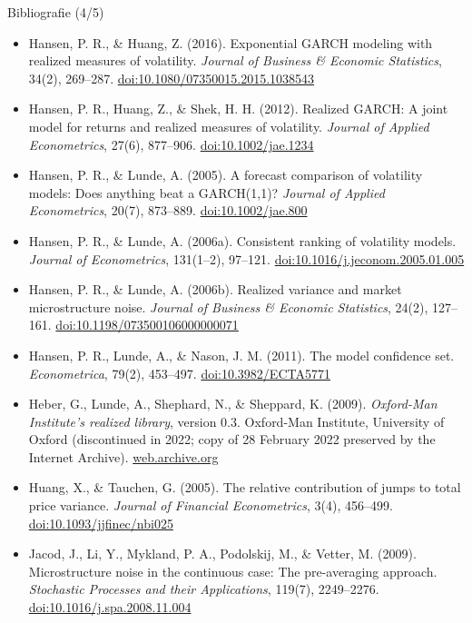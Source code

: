 \begin{frame}{Bibliografie (4/5)}
\itemsize{\tiny}
\begin{itemize}
    \item Hansen, P. R., \& Huang, Z. (2016). Exponential GARCH modeling with realized measures of volatility. \textit{Journal of Business \& Economic Statistics}, 34(2), 269--287. \href{https://doi.org/10.1080/07350015.2015.1038543}{doi:10.1080/07350015.2015.1038543}
    \item Hansen, P. R., Huang, Z., \& Shek, H. H. (2012). Realized GARCH: A joint model for returns and realized measures of volatility. \textit{Journal of Applied Econometrics}, 27(6), 877--906. \href{https://doi.org/10.1002/jae.1234}{doi:10.1002/jae.1234}
    \item Hansen, P. R., \& Lunde, A. (2005). A forecast comparison of volatility models: Does anything beat a GARCH(1,1)? \textit{Journal of Applied Econometrics}, 20(7), 873--889. \href{https://doi.org/10.1002/jae.800}{doi:10.1002/jae.800}
    \item Hansen, P. R., \& Lunde, A. (2006a). Consistent ranking of volatility models. \textit{Journal of Econometrics}, 131(1--2), 97--121. \href{https://doi.org/10.1016/j.jeconom.2005.01.005}{doi:10.1016/j.jeconom.2005.01.005}
    \item Hansen, P. R., \& Lunde, A. (2006b). Realized variance and market microstructure noise. \textit{Journal of Business \& Economic Statistics}, 24(2), 127--161. \href{https://doi.org/10.1198/073500106000000071}{doi:10.1198/073500106000000071}
    \item Hansen, P. R., Lunde, A., \& Nason, J. M. (2011). The model confidence set. \textit{Econometrica}, 79(2), 453--497. \href{https://doi.org/10.3982/ECTA5771}{doi:10.3982/ECTA5771}
    \item Heber, G., Lunde, A., Shephard, N., \& Sheppard, K. (2009). \textit{Oxford-Man Institute's realized library}, version 0.3. Oxford-Man Institute, University of Oxford (discontinued in 2022; copy of 28 February 2022 preserved by the Internet Archive). \href{https://web.archive.org/web/2021/https://realized.oxford-man.ox.ac.uk/terms-and-conditions}{web.archive.org}
    \item Huang, X., \& Tauchen, G. (2005). The relative contribution of jumps to total price variance. \textit{Journal of Financial Econometrics}, 3(4), 456--499. \href{https://doi.org/10.1093/jjfinec/nbi025}{doi:10.1093/jjfinec/nbi025}
    \item Jacod, J., Li, Y., Mykland, P. A., Podolskij, M., \& Vetter, M. (2009). Microstructure noise in the continuous case: The pre-averaging approach. \textit{Stochastic Processes and their Applications}, 119(7), 2249--2276. \href{https://doi.org/10.1016/j.spa.2008.11.004}{doi:10.1016/j.spa.2008.11.004}

\end{itemize}
\end{frame}
